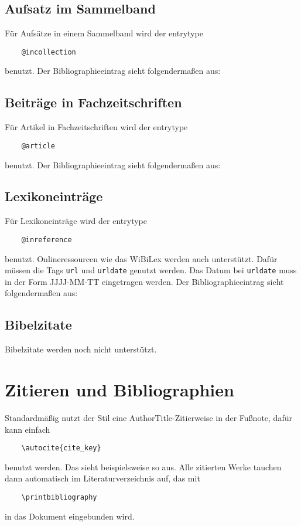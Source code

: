 \documentclass[12pt]{article}
\begin{document}
\subsection*{Aufsatz im Sammelband}
Für Aufsätze in einem Sammelband wird der entrytype
\begin{verbatim}
	@incollection
\end{verbatim}
benutzt. Der Bibliographieeintrag sieht folgendermaßen aus:
\printbibliography[type=incollection, title={}]


\subsection*{Beiträge in Fachzeitschriften}
Für Artikel in Fachzeitschriften wird der entrytype \nocite{*}
\begin{verbatim}
	@article
\end{verbatim}
benutzt. Der Bibliographieeintrag sieht folgendermaßen aus:
\printbibliography[type=article, title={}]

\subsection*{Lexikoneinträge} \label{Lexikon}
Für Lexikoneinträge wird der entrytype \nocite{*}
\begin{verbatim}
	@inreference
\end{verbatim}
benutzt. Onlineressourcen wie das WiBiLex werden auch unterstützt. Dafür müssen die Tags \verb#url# und \verb#urldate# genutzt werden. Das Datum bei \verb#urldate# muss in der Form JJJJ-MM-TT eingetragen werden.   Der Bibliographieeintrag sieht folgendermaßen aus:
\printbibliography[type=inreference, title={}]

\subsection*{Bibelzitate}
Bibelzitate werden noch nicht unterstützt.

\section{Zitieren und Bibliographien}
Standardmäßig nutzt der Stil eine AuthorTitle-Zitierweise in der Fußnote, dafür kann einfach
\begin{verbatim}
	\autocite{cite_key}
\end{verbatim}
benutzt werden. Das sieht beispielsweise so\autocite{berger_liturgie_1990} aus. Alle zitierten Werke tauchen dann automatisch im Literaturverzeichnis auf, das mit 
\begin{verbatim}
	\printbibliography
\end{verbatim}
in das Dokument eingebunden wird.
\end{document}
